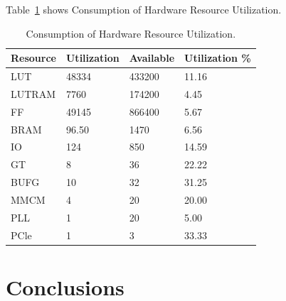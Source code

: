 \documentclass[conference]{IEEEtran}
\begin{document}
    Table~\ref{tab:resource utilization} shows Consumption of Hardware Resource Utilization.
    \begin{table}[]
        \caption{Consumption of Hardware Resource Utilization.}
        \begin{tabular}{|l|l|l|l|}
        \hline
        Resource & Utilization & Available & Utilization \% \\ \hline
        LUT      & 48334       & 433200    & 11.16          \\ \hline
        LUTRAM   & 7760        & 174200    & 4.45           \\ \hline
        FF       & 49145       & 866400    & 5.67           \\ \hline
        BRAM     & 96.50       & 1470      & 6.56           \\ \hline
        IO       & 124         & 850       & 14.59          \\ \hline
        GT       & 8           & 36        & 22.22          \\ \hline
        BUFG     & 10          & 32        & 31.25          \\ \hline
        MMCM     & 4           & 20        & 20.00          \\ \hline
        PLL      & 1           & 20        & 5.00           \\ \hline
        PCle     & 1           & 3         & 33.33          \\ \hline
        \end{tabular}
        \label{tab:resource utilization} 
        \end{table}

        
\section{Conclusions}\label{sec:conclusion}









\end{document}
